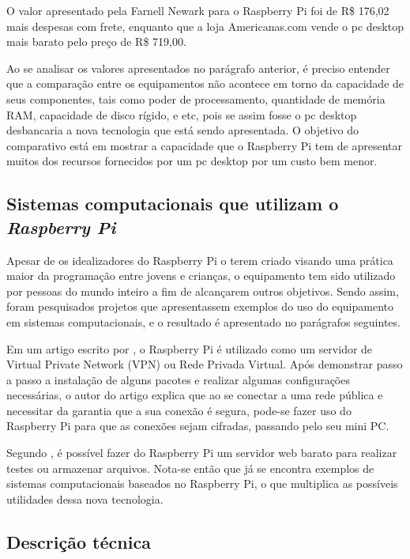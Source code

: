 O valor apresentado pela Farnell Newark para o Raspberry Pi foi de R\$ 176,02 mais despesas com frete, enquanto que a loja Americanas.com vende o pc desktop mais barato pelo preço de R\$ 719,00.

Ao se analisar os valores apresentados no parágrafo anterior, é preciso entender que a comparação entre os equipamentos não acontece em torno da capacidade de seus componentes, tais como poder de processamento, quantidade de memória RAM, capacidade de disco rígido, e etc, pois se assim fosse o pc desktop desbancaria a nova tecnologia que está sendo apresentada. O objetivo do comparativo está em mostrar a capacidade que o Raspberry Pi tem de apresentar muitos dos recursos fornecidos por um pc desktop por um custo bem menor.

\subsection{Sistemas computacionais que utilizam o \textit{Raspberry Pi}}

Apesar de os idealizadores do Raspberry Pi o terem criado visando uma prática maior da programação entre jovens e crianças, o equipamento tem sido utilizado por pessoas do mundo inteiro a fim de alcançarem outros objetivos. Sendo assim, foram pesquisados projetos que apresentassem exemplos do uso do equipamento em sistemas computacionais, e o resultado é apresentado no parágrafos seguintes.

Em um artigo escrito por , o Raspberry Pi é utilizado como um servidor de Virtual Private Network (VPN) ou Rede Privada Virtual. Após demonstrar passo a passo a instalação de alguns pacotes e realizar algumas configurações necessárias, o autor do artigo explica que ao se conectar a uma rede pública e necessitar da garantia que a sua conexão é segura, pode-se fazer uso do Raspberry Pi para que as conexões sejam cifradas, passando pelo seu mini PC.

Segundo , é possível fazer do Raspberry Pi um servidor web barato para realizar testes ou armazenar arquivos.
Nota-se então que já se encontra exemplos de sistemas computacionais baseados no Raspberry Pi, o que multiplica as possíveis utilidades dessa nova tecnologia.

\subsection{Descrição técnica}

